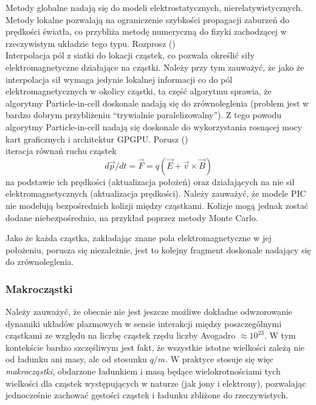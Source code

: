 \begin{itemize}
    Metody globalne nadają się do modeli elektrostatycznych,
    nierelatywistycznych.  Metody lokalne pozwalają na ograniczenie szybkości
    propagacji zaburzeń do prędkości światła, co przybliża metodę numeryczną do
    fizyki zachodzącej w rzeczywistym układzie tego typu.
    \itemi{} Rozprosz () \\
    Interpolacja pól z siatki do lokacji cząstek, co pozwala określić siły
    elektromagnetyczne działające na cząstki.  Należy przy tym zauważyć, że
    jako że interpolacja sił wymaga jedynie lokalnej informacji co do pól
    elektromagnetycznych w okolicy cząstki, ta część algorytmu sprawia, że
    algorytmy Particle-in-cell doskonale nadają się do zrównoleglenia (problem
    jest w bardzo dobrym przybliżeniu ``trywialnie paralelizowalny''). Z tego
    powodu algorytmy Particle-in-cell nadają się doskonale do wykorzystania
    rosnącej mocy kart graficznych i architektur GPGPU\@.
    \itemi{} Porusz () \\
    iteracja równań ruchu cząstek
    \begin{equation}
        d \vec{p}/dt = \vec{F} = q (\vec{E} + \vec{v} \times \vec{B})
        \label{eq-of-motion}
    \end{equation}
    na podstawie ich prędkości (aktualizacja położeń) oraz działających na nie
    sił elektromagnetycznych (aktualizacja prędkości). Należy zauważyć, że
    modele PIC nie modelują bezpośrednich kolizji między cząstkami. Kolizje
    mogą jednak zostać dodane niebezpośrednio, na przykład poprzez metody Monte
    Carlo.

    Jako że każda cząstka, zakładając znane pola elektromagnetyczne w jej
    położeniu, porusza się niezależnie, jest to kolejny fragment doskonale
    nadający się do zrównoleglenia.
    \end{itemize}
    \subsubsection{Makrocząstki}
    Należy zauważyć, że obecnie nie jest jeszcze możliwe dokładne odwzorowanie
    dynamiki układów plazmowych w sensie interakcji między poszczególnymi
    cząstkami ze względu na liczbę cząstek rzędu liczby Avogadro $\approx
    10^{23}$.  W tym kontekście bardzo szczęśliwym jest fakt, że wszystkie
    istotne wielkości zależą nie od ładunku ani masy, ale od stosunku $q/m$. W
    praktyce stosuje się więc \emph{makrocząstki}, obdarzone ładunkiem i masą
    będące wielokrotnościami tych wielkości dla cząstek występujących w naturze
    (jak jony i elektrony), pozwalając jednocześnie zachować gęstości cząstek i
    ładunku zbliżone do rzeczywistych.

